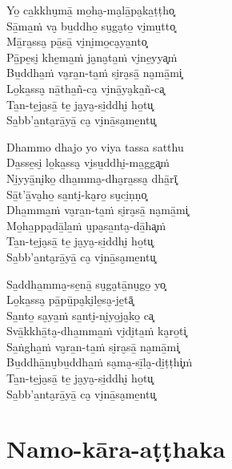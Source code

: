 \begin{paritta}
Yo̱ ca̱kkhu̮mā̱ mo̱ha̮-ma̮lā̱pa̮ka̱ṭṭho͓\\
Sā̱ma̱ṁ va̮ bu̱ddho̱ su̮ga̮to̱ vi̮mu̱tto͓\\
Mā̱ra̱ssa̮ pā̱sā̱ vi̮ni̮mo̱ca̮ya̱nto͓\\
Pā̱pe̱si̮ khe̱ma̱ṁ ja̮na̮ta̱ṁ vi̮ne̱yya͓ṁ\\
Bu̱ddha̱ṁ va̮ra̱n-ta̱ṁ si̮ra̮sā̱ na̮mā̱mi͓\\
Lo̱ka̱ssa̮ nā̱tha̱ñ-ca̮ vi̮nā̱ya̮ka̱ñ-ca͓\\
Ta̱n-te̱ja̮sā̱ te̱ ja̮ya̮-si̱ddhi̮ ho̱tu͓\\
Sa̱bb'a̱nta̮rā̱yā̱ ca̮ vi̮nā̱sa̮me̱ntu͓

Dhammo dhajo yo viya tassa satthu\\
Da̱sse̱si̮ lo̱ka̱ssa̮ vi̮su̱ddhi̮-ma̱gga͓ṁ\\
Ni̱yyā̱ni̮ko̱ dha̱mma̮-dha̮ra̱ssa̮ dhā̱rī͓\\
Sā̱t'ā̱va̮ho̱ sa̱nti̮-ka̮ro̱ su̮ci̱ṇṇo͓\\
Dha̱mma̱ṁ va̮ra̱n-ta̱ṁ si̮ra̮sā̱ na̮mā̱mi͓\\
Mo̱ha̱ppa̮dā̱la̱ṁ u̮pa̮sa̱nta̮-dā̱ha͓ṁ\\
Ta̱n-te̱ja̮sā̱ te̱ ja̮ya̮-si̱ddhi̮ ho̱tu͓\\
Sa̱bb'a̱nta̮rā̱yā̱ ca̮ vi̮nā̱sa̮me̱ntu͓

Sa̱ddha̱mma̮-se̱nā̱ su̮ga̮tā̱nu̮go̱ yo͓\\
Lo̱ka̱ssa̮ pā̱pū̱pa̮ki̮le̱sa̮-je̱tā͓\\
Sa̱nto̱ sa̮ya̱ṁ sa̱nti̮-ni̮yo̱ja̮ko̱ ca͓\\
Svā̱kkhā̱ta̮-dha̱mma̱ṁ vi̮di̮ta̱ṁ ka̮ro̱ti͓\\
Sa̱ṅgha̱ṁ va̮ra̱n-ta̱ṁ si̮ra̮sā̱ na̮mā̱mi͓\\
Bu̱ddhā̱nu̮bu̱ddha̱ṁ sa̮ma̮-sī̱la̮-di̱ṭṭhi͓ṁ\\
Ta̱n-te̱ja̮sā̱ te̱ ja̮ya̮-si̱ddhi̮ ho̱tu͓\\
Sa̱bb'a̱nta̮rā̱yā̱ ca̮ vi̮nā̱sa̮me̱ntu͓
\end{paritta}

\clearpage

\chapter{Namo-kāra-aṭṭhaka}


